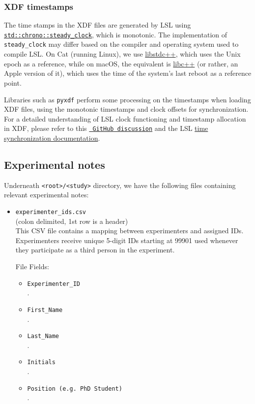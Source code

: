 \subsubsection{XDF timestamps}

The time stamps in the XDF files are generated by LSL using
\href{https://en.cppreference.com/w/cpp/chrono/steady_clock}{\texttt{std::chrono::steady\_clock}},
which is monotonic.  The implementation of \verb|steady_clock| may differ based
on the compiler and operating system used to compile LSL. On Cat (running
Linux), we use \href{https://gcc.gnu.org}{libstdc++}, which uses the
Unix epoch as a reference, while on macOS,
the equivalent is \href{https://libcxx.llvm.org}{libc++} (or rather, an
Apple version of it), which uses the time of the system's last reboot as a
reference point.

Libraries such as \verb|pyxdf| perform some processing on the timestamps when
loading XDF files, using the monotonic timestamps and
clock offsets for synchronization. For a detailed understanding of LSL clock
functioning and timestamp allocation in XDF, please refer to
this \href{https://github.com/labstreaminglayer/App-LabRecorder/issues/101}{\texttt{
GitHub discussion}} and the LSL
\href{https://labstreaminglayer.readthedocs.io/info/time_synchronization.html}{time
synchronization documentation}.

\subsection{Experimental notes}
\label{subsec:exp_notes}

Underneath \verb|<root>/<study>| directory, we have the following
files containing relevant experimental notes:
%
\begin{itemize}
\item\verb|experimenter_ids.csv|\\
    (colon delimited, 1st row is a header)\\
    This CSV file contains a mapping between experimenters and assigned IDs. Experimenters receive unique 5-digit IDs starting at 99901 used whenever they participate as a third person in the experiment. 
    
File Fields:
\begin{itemize}
    \item \verb|Experimenter_ID|\\.        
    \item \verb|First_Name|\\.
    \item \verb|Last_Name|\\.
    \item \verb|Initials|\\.
    \item \verb|Position (e.g. PhD Student)|\\.
\end{itemize}
\end{itemize}

